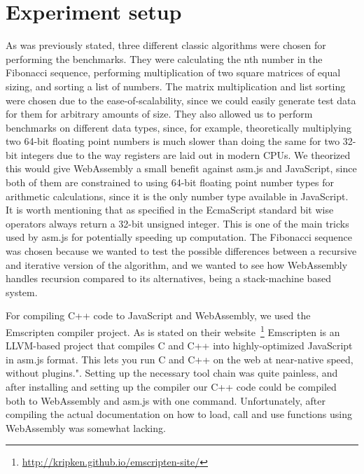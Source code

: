 \documentclass[conference]{IEEEtran}
\begin{document}
\section{Experiment setup}

As was previously stated, three different classic algorithms were chosen for
performing the benchmarks. They were calculating the nth number in the
Fibonacci sequence, performing multiplication of two square matrices of equal
sizing, and sorting a list of numbers. The matrix multiplication and list
sorting were chosen due to the ease-of-scalability, since we could easily
generate test data for them for arbitrary amounts of size. They also allowed us
to perform benchmarks on different data types, since, for example,
theoretically multiplying two 64-bit floating point numbers is much slower than
doing the same for two 32-bit integers due to the way registers are laid out in
modern CPUs. We theorized this would give WebAssembly a small benefit against
asm.js and JavaScript, since both of them are constrained to using 64-bit
floating point number types for arithmetic calculations, since it is the only
number type available in JavaScript. It is worth mentioning that as specified
in the EcmaScript standard\cite{EcmaScript} bit wise operators always return a
32-bit unsigned integer. This is one of the main tricks used by asm.js for
potentially speeding up computation. The Fibonacci sequence was chosen
because we wanted to test the possible differences between a recursive and
iterative version of the algorithm, and we wanted to see how WebAssembly
handles recursion compared to its alternatives, being a stack-machine based
system.

For compiling C++ code to JavaScript and WebAssembly, we used the Emscripten
compiler project. As is stated on their
website~\footnote{\url{http://kripken.github.io/emscripten-site/}} Emscripten
is an LLVM-based project that compiles C and C++ into highly-optimized
JavaScript in asm.js format. This lets you run C and C++ on the web at
near-native speed, without plugins.". Setting up the necessary tool chain was
quite painless, and after installing and setting up the compiler our C++ code
could be compiled both to WebAssembly and asm.js with one command.
Unfortunately, after compiling the actual documentation on how to load, call
and use functions using WebAssembly was somewhat lacking.
\end{document}
